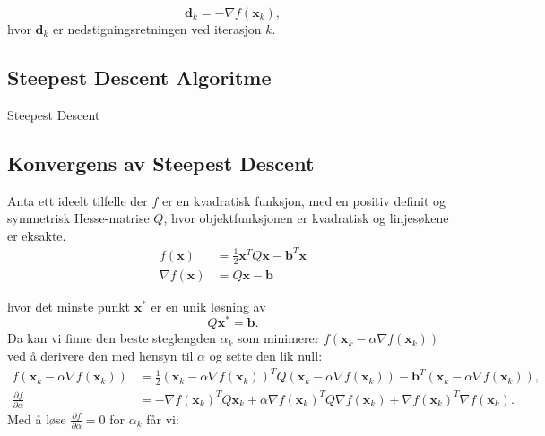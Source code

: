 \begin{equation}
	\symbf{d}_k = -\nabla f(\symbf{x}_k),
\end{equation}
hvor \(\symbf{d}_k\) er nedstigningsretningen ved iterasjon \(k\).
\subsection{Steepest Descent Algoritme}
\begin{algorithm}[H]
	\SetAlgoLined
	\caption{Steepest Descent}
	\label{alg:steepest_descent}
\end{algorithm}

\subsection{Konvergens av Steepest Descent}
Anta ett ideelt tilfelle der \(f\) er en kvadratisk funksjon, med en positiv definit og symmetrisk Hesse-matrise \(Q\), hvor objektfunksjonen er kvadratisk og linjesøkene er eksakte.
\begin{align*}
	f(\symbf{x})        & = \frac{1}{2} \symbf{x}^T Q \symbf{x} - \symbf{b}^T \symbf{x} \\
	\nabla f(\symbf{x}) & = Q \symbf{x} - \symbf{b}
\end{align*}\label{eq:quadratic_function}

hvor det minste punkt \(\symbf{x}^\ast\) er en unik løsning av
\[
	Q \symbf{x}^\ast = \symbf{b}.
\]
Da kan vi finne den beste steglengden \(\alpha_k\) som minimerer \(f(\symbf{x}_k - \alpha \nabla f(\symbf{x}_k))\) ved å derivere den med hensyn til \(\alpha\) og sette den lik null:
\begin{align*}
	f(\symbf{x}_k - \alpha \nabla f(\symbf{x}_k)) & = \frac{1}{2} (\symbf{x}_k - \alpha \nabla f(\symbf{x}_k))^T Q (\symbf{x}_k - \alpha \nabla f(\symbf{x}_k)) - \symbf{b}^T (\symbf{x}_k - \alpha \nabla f(\symbf{x}_k)), \\
	\frac{\partial f}{\partial \alpha}            & = -\nabla f(\symbf{x}_k)^T Q \symbf{x}_k + \alpha \nabla f(\symbf{x}_k)^T Q \nabla f(\symbf{x}_k) + \nabla f(\symbf{x}_k)^T \nabla f(\symbf{x}_k).
\end{align*}
Med å løse \(\frac{\partial f}{\partial \alpha} = 0\) for \(\alpha_k\) får vi:

